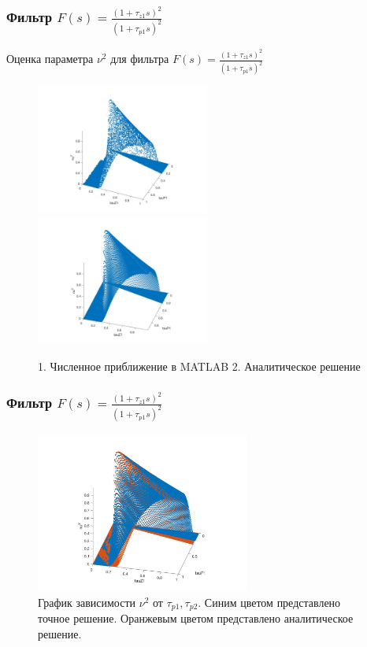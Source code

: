 \documentclass{beamer}
\begin{document}

\begin{frame}
\frametitle{Фильтр $F(s) = \frac{(1+\tau_{z1}s)^2}{(1+\tau_{p1}s)^2}$}

Оценка параметра $\nu^2$ для фильтра $F(s) = \frac{(1+\tau_{z1}s)^2}{(1+\tau_{p1}s)^2}$
  \begin{figure}[H]
  \includegraphics[width=5.7cm]{images/filter2_tau0_1e.jpg}
  \includegraphics[width=5.7cm]{images/filter2_tau0_1.jpg}
    \caption{1. Численное приближение в MATLAB 2. Аналитическое решение}
    \end{figure}

\end{frame}

\begin{frame}
\frametitle{Фильтр $F(s) = \frac{(1+\tau_{z1}s)^2}{(1+\tau_{p1}s)^2}$}

  \begin{figure}[H] 
  \includegraphics[width=7cm]{images/main.jpg}
\caption{График зависимости $\nu^2$ от $\tau_{p1}, \tau_{p2}$.  Синим цветом представлено точное решение. Оранжевым цветом представлено аналитическое решение.}
\end{figure}

\end{frame}
\end{document}
